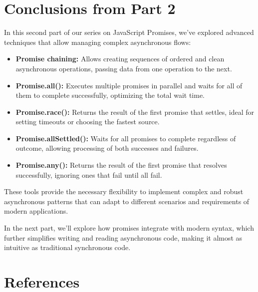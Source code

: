 \section{Conclusions from Part 2}

In this second part of our series on JavaScript Promises, we've explored advanced techniques that allow managing complex asynchronous flows:

\begin{itemize}
    \item \textbf{\textcolor{accentColor}{Promise chaining:}} Allows creating sequences of ordered and clean asynchronous operations, passing data from one operation to the next.
    
    \item \textbf{\textcolor{accentColor}{Promise.all():}} Executes multiple promises in parallel and waits for all of them to complete successfully, optimizing the total wait time.
    
    \item \textbf{\textcolor{accentColor}{Promise.race():}} Returns the result of the first promise that settles, ideal for setting timeouts or choosing the fastest source.
    
    \item \textbf{\textcolor{accentColor}{Promise.allSettled():}} Waits for all promises to complete regardless of outcome, allowing processing of both successes and failures.
    
    \item \textbf{\textcolor{accentColor}{Promise.any():}} Returns the result of the first promise that resolves successfully, ignoring ones that fail until all fail.
\end{itemize}

These tools provide the necessary flexibility to implement complex and robust asynchronous patterns that can adapt to different scenarios and requirements of modern applications.

In the next part, we'll explore how promises integrate with modern  syntax, which further simplifies writing and reading asynchronous code, making it almost as intuitive as traditional synchronous code.

\section{References}

